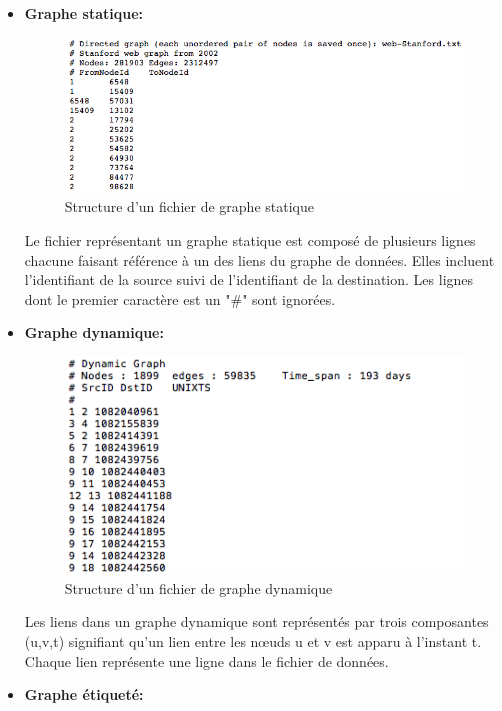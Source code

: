 	\begin{itemize}[label=$\bullet$]
	\item \textbf{Graphe statique:}
	
	\begin{figure}[H]
	\centering
	\label{Img:statiqugr}
	\includegraphics[scale=0.65]{ressources/image/statiqugr.png}
	\caption{Structure d'un fichier de graphe statique}
 \end{figure}
	
	Le fichier représentant un graphe statique est composé de plusieurs lignes chacune faisant référence à un des liens du graphe de données. Elles incluent l'identifiant de la source suivi de  l'identifiant de la destination. Les lignes dont le premier caractère est un "\#" sont ignorées.
	\item \textbf{Graphe dynamique: } 
	
	\begin{figure}[H]
	
	\label{Img:dynamiqgr}
	\includegraphics[scale=0.7]{ressources/image/dynamiqgr.png}
	\caption{Structure d'un fichier de graphe dynamique}
 \end{figure}
Les liens dans un graphe dynamique sont représentés par trois composantes (u,v,t)	signifiant qu'un lien entre les nœuds u et v est apparu à l'instant t. Chaque lien représente une ligne dans le fichier de données.
	
	\item \textbf{Graphe étiqueté:} 
	\begin{figure}[H]
	

\end{figure}
\end{itemize}
